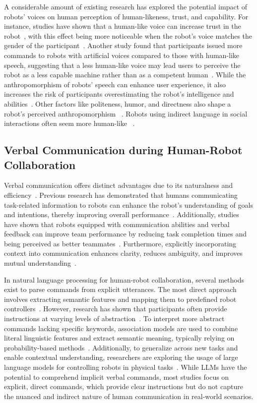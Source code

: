 A considerable amount of existing research has explored the potential impact of robots' voices on human perception of human-likeness, trust, and capability. For instance, studies have shown that a human-like voice can increase trust in the robot~\cite{xu2019first}, with this effect being more noticeable when the robot's voice matches the gender of the participant~\cite{eyssel2012if}. Another study found that participants issued more commands to robots with artificial voices compared to those with human-like speech, suggesting that a less human-like voice may lead users to perceive the robot as a less capable machine rather than as a competent human~\cite{sims2009robots}. While the anthropomorphism of robots' speech can enhance user experience, it also increases the risk of participants overestimating the robot's intelligence and abilities~\cite{cha2015perceived}. Other factors like politeness, humor, and directness also shape a robot's perceived anthropomorphism ~\cite{emnett2024using}. Robots using indirect language in social interactions often seem more human-like ~\cite{saunderson2021robots}.

\subsection{Verbal Communication during Human-Robot Collaboration}
Verbal communication offers distinct advantages due to its naturalness and efficiency~\cite{liu2019review}. Previous research has demonstrated that humans communicating task-related information to robots can enhance the robot's understanding of goals and intentions, thereby improving overall performance~\cite{breazeal2004designing}. Additionally, studies have shown that robots equipped with communication abilities and verbal feedback can improve team performance by reducing task completion times and being perceived as better teammates~\cite{st2015robot}. Furthermore, explicitly incorporating context into communication enhances clarity, reduces ambiguity, and improves mutual understanding~\cite{mavridis2005grounded, tellex2014asking}.

In natural language processing for human-robot collaboration, several methods exist to parse commands from explicit utterances. The most direct approach involves extracting semantic features and mapping them to predefined robot controllers~\cite{tellex2006spatial}. However, research has shown that participants often provide instructions at varying levels of abstraction~\cite{anderson2018vision}. To interpret more abstract commands lacking specific keywords, association models are used to combine literal linguistic features and extract semantic meaning, typically relying on probability-based methods~\cite {misra2016tell, liu2016natural, matuszek2013learning}. Additionally, to generalize across new tasks and enable contextual understanding, researchers are exploring the usage of large language models for controlling robots in physical tasks~\cite{singh2023progprompt, macdonald2024language, liang2023code, zhao2024large}. While LLMs have the potential to comprehend implicit verbal commands, most studies focus on explicit, direct commands, which provide clear instructions but do not capture the nuanced and indirect nature of human communication in real-world scenarios.

